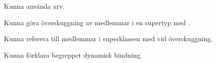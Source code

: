 
\item Kunna använda arv.
\item Kunna göra överskuggning av medlemmar i en supertyp med .
\item Kunna referera till medlemmar i superklassen med  vid överskuggning.
\item Kunna förklara begreppet dynamisk bindning.
